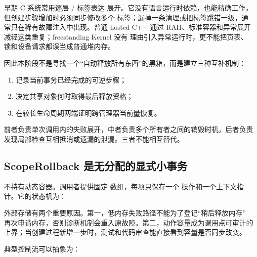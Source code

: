 早期 C 系统常用逐层 / 标签表达
展开。它没有语言运行时依赖，也能精确工作，但创建步骤增加时必须同步修改多个
标签；漏掉一条清理或把标签跳错一级，通常只在稀有故障注入中出现。普通 hosted
C++ 通过 RAII、标准容器和异常展开减轻这类重复；freestanding Kernel 没有
理由引入异常运行时，更不能把页表、锁和设备请求都误当成普通堆内存。

因此本阶段不是寻找一个“自动释放所有东西”的黑箱，而是建立三种互补机制：

\begin{enumerate}[label=\arabic*.]
  \item {} 记录当前事务已经完成的可逆步骤；
  \item {} 决定共享对象何时取得最后释放资格；
  \item {} 在较长生命周期两端证明跨管理器当前量恢复。
\end{enumerate}

前者负责单次调用内的失败展开，中者负责多个所有者之间的销毁时机，后者负责
发现局部检查互相抵消或遗漏的泄漏。三者不能相互替代。

\subsection{ScopeRollback 是无分配的显式小事务}

 不持有动态容器。调用者提供固定
 数组，每项只保存一个
 操作和一个上下文指针。它的状态机为：

\begin{center}
\end{center}

外部存储有两个重要原因。第一，低内存失败路径不能为了登记“稍后释放内存”
再次申请内存，否则诊断机制会重入原故障。第二，动作容量成为调用点可审计的
上界；当创建过程新增一步时，测试和代码审查能直接看到容量是否同步改变。

典型控制流可以抽象为：

